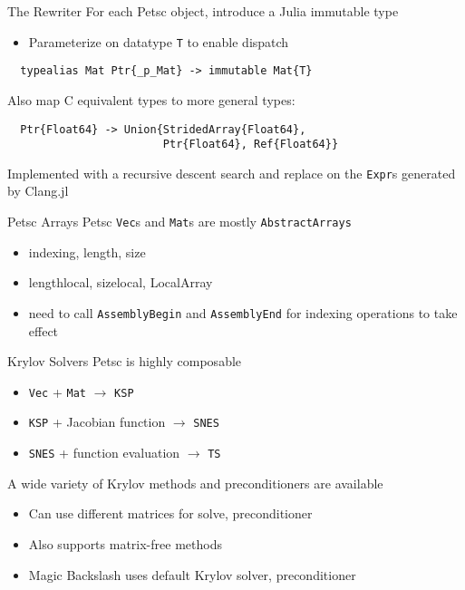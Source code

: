 \documentclass{beamer}
\begin{document}
\begin{frame}[fragile]{The Rewriter}
For each Petsc object, introduce a Julia immutable type
\begin{itemize}
  \item Parameterize on datatype \texttt{T} to enable dispatch
\end{itemize}
\begin{verbatim}
  typealias Mat Ptr{_p_Mat} -> immutable Mat{T}
\end{verbatim}
\hfill

Also map C equivalent types to more general types:
\begin{verbatim} 
  Ptr{Float64} -> Union{StridedArray{Float64},
                        Ptr{Float64}, Ref{Float64}}
\end{verbatim}
\hfill

Implemented with a recursive descent search and replace on the \texttt{Expr}s 
generated by Clang.jl

\end{frame}

\begin{frame}{Petsc Arrays}
Petsc \texttt{Vec}s and \texttt{Mat}s are mostly \texttt{AbstractArrays}
\begin{itemize}
  \item indexing, length, size
  \item lengthlocal, sizelocal, LocalArray
  \item need to call \texttt{AssemblyBegin} and \texttt{AssemblyEnd} for indexing operations to take effect
\end{itemize}

\end{frame}

\begin{frame}{Krylov Solvers}
Petsc is highly composable
\begin{itemize}
  \item \texttt{Vec} + \texttt{Mat} $\rightarrow$ \texttt{KSP}
  \item \texttt{KSP} + Jacobian function $\rightarrow$ \texttt{SNES}
  \item \texttt{SNES} + function evaluation $\rightarrow$ \texttt{TS}
\end{itemize}
\hfill

A wide variety of Krylov methods and preconditioners are available
\begin{itemize}
  \item Can use different matrices for solve, preconditioner
  \item Also supports matrix-free methods
  \item Magic Backslash uses default Krylov solver, preconditioner
\end{itemize}

\end{frame}
\end{document}
